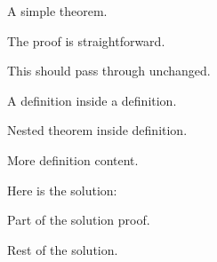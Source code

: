 \documentclass{article}
\begin{document}
\begin{theorem}
A simple theorem.
\end{theorem}

\begin{solution}
The proof is straightforward.
\end{solution}

\begin{unknownenv}
This should pass through unchanged.
\end{unknownenv}

\begin{definition}
A definition inside a definition.
\begin{theorem}
Nested theorem inside definition.
\end{theorem}
More definition content.
\end{definition}

\begin{solution}
Here is the solution:
\begin{theorem}
Part of the solution proof.
\end{theorem}
Rest of the solution.
\end{solution}
\end{document}
